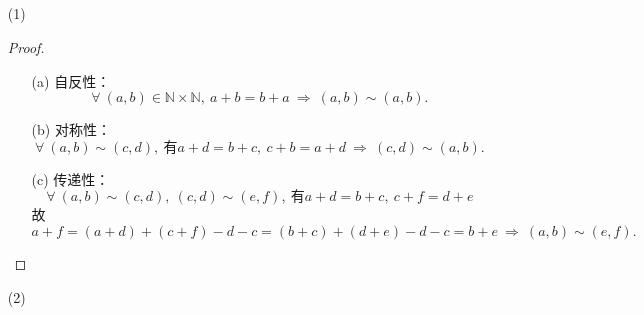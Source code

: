 \documentclass[UTF8]{ctexart}
\begin{document}
\subsection{}   %
\begin{enumerate}
    \item [(1)]
    \begin{proof}
        \begin{enumerate}
            \item [(a)]自反性：
            \[
                \forall\ (a,b)\in \mathbb{N}\times \mathbb{N},\ 
                a+b = b+a\ \Rightarrow\ (a,b)\sim (a,b).    
            \]
            \item [(b)]对称性：
            \[
                \forall\ (a,b)\sim (c,d),\ \mbox{有}
                a+d = b+c,\ c+b = a+d
                \ \Rightarrow\ 
                (c,d)\sim (a,b).    
            \]
            \item [(c)]传递性：
            \[
                \forall\ (a,b)\sim (c,d),\ (c,d)\sim (e,f),\ \mbox{有}
                a+d = b+c,\ c+f = d+e
            \]
            故
            \[
                a+f = (a+d)+(c+f)-d-c = (b+c)+(d+e)-d-c = b+e
                \ \Rightarrow\ 
                (a,b)\sim (e,f).
            \]
        \end{enumerate}
    \end{proof}
    \item [(2)]
\end{enumerate}

\subsection{}   %



\subsection{}   %



\subsection{}   %



\subsection{}   %
\end{document}
